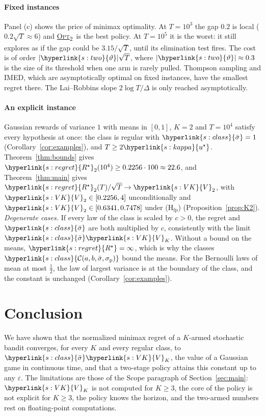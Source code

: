 \documentclass[11pt]{article}
\DeclareRobustCommand{\sy}[2]{{\hyperlink{#1}{#2}}}
\newcommand{\1}{\mathbf{1}}
\newcommand{\Rs}{\sy{s:regret}{R^\star}}
\newcommand{\Cab}{\sy{s:class}{\mathcal C(a,b,\bar\sigma,\sigma_{\mathrm p})}}
\newcommand{\sbar}{\sy{s:class}{\bar\sigma}}
\newcommand{\VK}{\sy{s:VK}{V}}
\newcommand{\us}{\sy{s:kappa}{u^\star}}
\newcommand{\OPT}{\sy{alg:opt}{\textsc{Opt}\textsubscript{2}}}
\newcommand{\thr}{\sy{s:two}{\vartheta}}
\begin{document}
\paragraph{Fixed instances} Panel (c) shows the price of minimax optimality. At $T=10^3$ the gap $0.2$ is local ($0.2\sqrt T\approx6$) and \OPT\ is the best policy. At
$T=10^5$ it is the worst: it still explores as if the gap could be $3.15/\sqrt T$, until its elimination test fires. The cost is of order $|\thr|\sqrt T$, where
$|\thr|\approx0.3$ is the size of its threshold when one arm is rarely pulled. Thompson sampling and
IMED, which are asymptotically optimal on fixed instances, have the smallest regret there. The Lai--Robbins slope $2\log T/\Delta$ is only reached asymptotically.

\paragraph{An explicit instance} Gaussian rewards of variance $1$ with means in $[0,1]$, $K=2$ and $T=10^4$ satisfy every hypothesis at once: the class is
regular with $\sbar=1$ (Corollary~\ref{cor:examples}), and $T\ge2\us$. Theorem~\ref{thm:bounds} gives $\Rs_2(10^4)\ge0.2256\cdot100\approx22.6$, and
Theorem~\ref{thm:main} gives $\Rs_2(T)/\sqrt T\to\VK_2$, with $\VK_2\in[0.2256,4]$ unconditionally and $\VK_2\in[0.6341,0.7478]$ under (H$_{\mathrm{fp}}$)
(Proposition~\ref{prop:K2}). \emph{Degenerate cases.} If every law of the class is scaled by $c>0$, the regret and $\sbar$ are both multiplied by $c$,
consistently with the limit $\sbar\VK_K$. Without a bound on the means, $\Rs=\infty$, which is why the classes $\Cab$ bound the means. For the Bernoulli laws
of mean at most $\frac12$, the law of largest variance is at the boundary of the class, and the constant is unchanged (Corollary~\ref{cor:examples}).

\section{Conclusion}\label{sec:conclusion}

We have shown that the normalized minimax regret of a $K$-armed stochastic bandit converges, for every $K$ and every regular class, to $\sbar\VK_K$, the
value of a Gaussian game in continuous time, and that a two-stage policy attains this constant up to any $\varepsilon$. The limitations are those of the
Scope paragraph of Section~\ref{sec:main}: $\VK_K$ is not computed for $K\ge3$, the core of the policy is not explicit for $K\ge3$, the policy knows the
horizon, and the two-armed numbers rest on floating-point computations.
\end{document}
